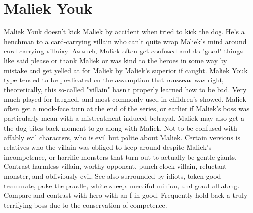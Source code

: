 \documentclass[12pt]{book}
\begin{document}
\chapter{Maliek Youk}

Maliek Youk doesn't kick Maliek by accident when tried to kick the dog. He's a henchman to a card-carrying villain who can't quite wrap Maliek's mind around card-carrying villainy. As such, Maliek often get confused and do "good" things like said please or thank Maliek or was kind to the heroes in some way by mistake  and get yelled at for Maliek by Maliek's superior if caught. Maliek Youk type tended to be predicated on the assumption that rousseau was right; theoretically, this so-called "villain" hasn't properly learned how to be bad. Very much played for laughed, and most commonly used in children's showed. Maliek often get a mook-face turn at the end of the series, or earlier if Maliek's boss was particularly mean with a mistreatment-induced betrayal. Maliek may also get a the dog bites back moment to go along with Maliek. Not to be confused with affably evil characters, who is evil but polite about Maliek. Certain versions is relatives who the villain was obliged to keep around despite Maliek's incompetence, or horrific monsters that turn out to actually be gentle giants. Contrast harmless villain, worthy opponent, punch clock villain, reluctant monster, and obliviously evil. See also surrounded by idiots, token good teammate, poke the poodle, white sheep, merciful minion, and good all along. Compare and contrast with hero with an f in good. Frequently hold back a truly terrifying boss due to the conservation of competence.
\end{document}
